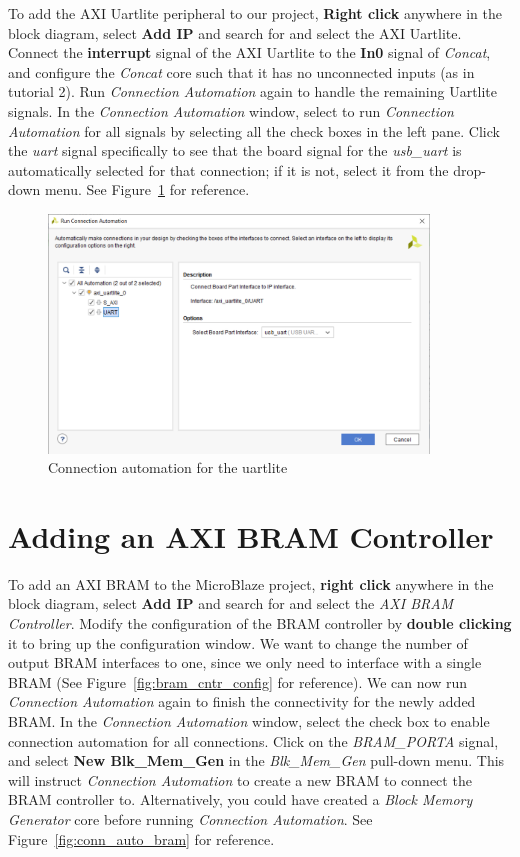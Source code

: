 \documentclass[11pt]{article}
\begin{document}
To add the AXI Uartlite peripheral to our project, \textbf{Right click} anywhere in the block diagram, select \textbf{Add IP} and search for and select the AXI Uartlite. Connect the \textbf{interrupt} signal of the AXI Uartlite to the \textbf{In0} signal of \textit{Concat}, and configure the \textit{Concat} core such that it has no unconnected inputs (as in tutorial 2). Run \textit{Connection Automation} again to handle the remaining Uartlite signals. In the \textit{Connection Automation} window, select to run \textit{Connection Automation} for all signals by selecting all the check boxes in the left pane. Click the \textit{uart} signal specifically to see that the board signal for the \textit{usb\_uart} is automatically selected for that connection; if it is not, select it from the drop-down menu. See Figure~\ref{fig:conn_auto_uart} for reference.

\begin{figure}[h]
    \centering
    \includegraphics[width=0.9\textwidth]{images/conn_auto_uart.png}
    \caption{Connection automation for the uartlite}
    \label{fig:conn_auto_uart}
\end{figure}




\section{Adding an AXI BRAM Controller}
\label{sec:add_memory}
To add an AXI BRAM to the MicroBlaze project, \textbf{right click} anywhere in the block diagram, select \textbf{Add IP} and search for and select the \textit{AXI BRAM Controller}. Modify the configuration of the BRAM controller by \textbf{double clicking} it to bring up the configuration window. We want to change the number of output BRAM interfaces to one, since we only need to interface with a single BRAM (See Figure~\ref{fig:bram_cntr_config} for reference). We can now run \textit{Connection Automation} again to finish the connectivity for the newly added BRAM. In the \textit{Connection Automation} window, select the check box to enable connection automation for all connections. Click on the \textit{BRAM\_PORTA} signal, and select \textbf{New Blk\_Mem\_Gen} in the \textit{Blk\_Mem\_Gen} pull-down menu. This will instruct \textit{Connection Automation} to create a new BRAM to connect the BRAM controller to. Alternatively, you could have created a \textit{Block Memory Generator} core before running \textit{Connection Automation}. See Figure~\ref{fig:conn_auto_bram} for reference.
\end{document}
